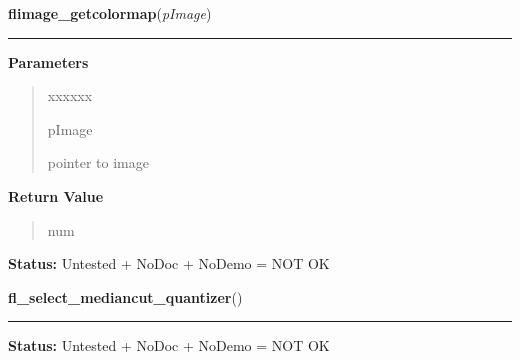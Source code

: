 \hspace{.8\funcindent}\begin{boxedminipage}{\funcwidth}

    \raggedright \textbf{flimage\_getcolormap}(\textit{pImage})

    \vspace{-1.5ex}

    \rule{\textwidth}{0.5\fboxrule}
\setlength{\parskip}{2ex}
\setlength{\parskip}{1ex}
      \textbf{Parameters}
      \vspace{-1ex}

      \begin{quote}
        \begin{Ventry}{xxxxxx}

          \item[pImage]

          pointer to image

        \end{Ventry}

      \end{quote}

      \textbf{Return Value}
    \vspace{-1ex}

      \begin{quote}
      num

      \end{quote}

\textbf{Status:} Untested + NoDoc + NoDemo = NOT OK



    \end{boxedminipage}

    \label{xformslib:flflimage:fl_select_mediancut_quantizer}

    \vspace{0.5ex}

\hspace{.8\funcindent}\begin{boxedminipage}{\funcwidth}

    \raggedright \textbf{fl\_select\_mediancut\_quantizer}()

    \vspace{-1.5ex}

    \rule{\textwidth}{0.5\fboxrule}
\setlength{\parskip}{2ex}
\setlength{\parskip}{1ex}
\textbf{Status:} Untested + NoDoc + NoDemo = NOT OK



    \end{boxedminipage}

